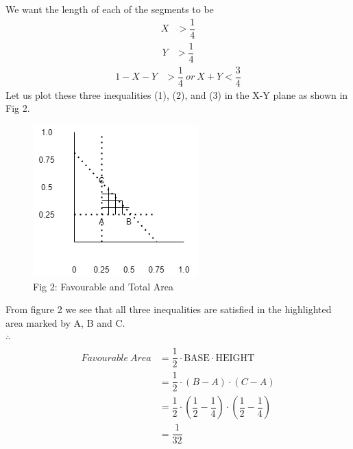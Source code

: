 \documentclass[journal,12pt,twocolumn]{IEEEtran}
\begin{document}
We want the length of each of the segments to be
\begin{align}\tag{1}
    X & > \dfrac{1}{4}
\end{align}
\begin{align}\tag{2}
    Y & > \dfrac{1}{4}
\end{align}
\begin{align}\tag{3}
    1-X-Y & > \dfrac{1}{4}\ or\ X + Y < \dfrac{3}{4}
\end{align}
Let us plot these three inequalities (1), (2), and (3) in the X-Y plane as shown in Fig 2.
\begin{figure}[h!]
    \includegraphics[width=\columnwidth]{Challenge-Problem/9/Figure/LineSeq1.png}
    \centering \caption*{Fig 2: Favourable and Total Area}
\end{figure}
From figure 2 we see that all three inequalities are satisfied in the highlighted area marked by A, B and C.\\
$\therefore$
\begin{align}\tag{4}
    \begin{split}
        Favourable\ Area &= \dfrac{1}{2}\cdot\text{BASE}\cdot\text{HEIGHT}\\
                        &= \dfrac{1}{2}\cdot(B-A)\cdot(C-A)\\
                        &= \dfrac{1}{2}\cdot(\dfrac{1}{2}-\dfrac{1}{4})\cdot(\dfrac{1}{2}-\dfrac{1}{4})\\
                        &= \dfrac{1}{32}
    \end{split}
\end{align}
\end{document}
